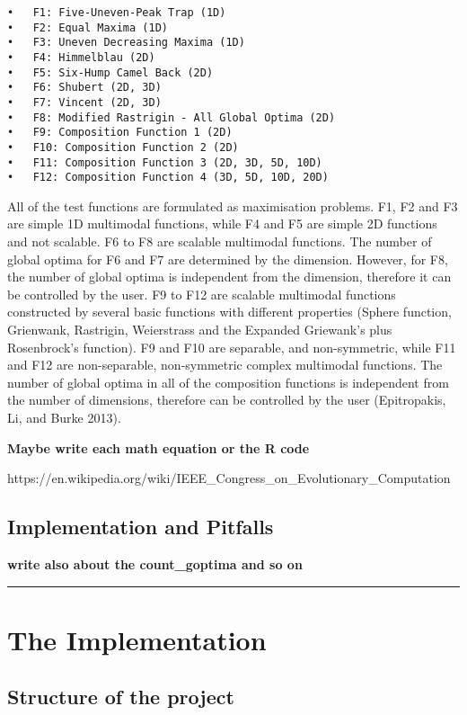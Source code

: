 \documentclass[12pt,a4paper]{article}
\begin{document}
\begin{verbatim}
•   F1: Five-Uneven-Peak Trap (1D)
•   F2: Equal Maxima (1D)
•   F3: Uneven Decreasing Maxima (1D)
•   F4: Himmelblau (2D)
•   F5: Six-Hump Camel Back (2D)
•   F6: Shubert (2D, 3D)
•   F7: Vincent (2D, 3D)
•   F8: Modified Rastrigin - All Global Optima (2D)
•   F9: Composition Function 1 (2D)
•   F10: Composition Function 2 (2D)
•   F11: Composition Function 3 (2D, 3D, 5D, 10D)
•   F12: Composition Function 4 (3D, 5D, 10D, 20D)
\end{verbatim}

All of the test functions are formulated as maximisation problems. F1,
F2 and F3 are simple 1D multimodal functions, while F4 and F5 are simple
2D functions and not scalable. F6 to F8 are scalable multimodal
functions. The number of global optima for F6 and F7 are determined by
the dimension. However, for F8, the number of global optima is
independent from the dimension, therefore it can be controlled by the
user. F9 to F12 are scalable multimodal functions constructed by several
basic functions with different properties (Sphere function, Grienwank,
Rastrigin, Weierstrass and the Expanded Griewank's plus Rosenbrock's
function). F9 and F10 are separable, and non-symmetric, while F11 and
F12 are non-separable, non-symmetric complex multimodal functions. The
number of global optima in all of the composition functions is
independent from the number of dimensions, therefore can be controlled
by the user (Epitropakis, Li, and Burke 2013).

\textbf{Maybe write each math equation or the R code}

https://en.wikipedia.org/wiki/IEEE\_Congress\_on\_Evolutionary\_Computation

\subsection{Implementation and
Pitfalls}\label{implementation-and-pitfalls}

\textbf{write also about the count\_goptima and so on}

\begin{center}\rule{0.5\linewidth}{\linethickness}\end{center}

\section{The Implementation}\label{the-implementation}

\subsection{Structure of the project}\label{structure-of-the-project}
\end{document}
